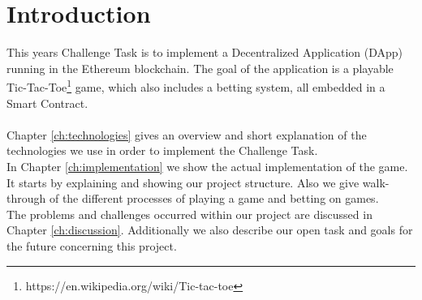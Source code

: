 \chapter{Introduction}\label{ch:introduction}
This years Challenge Task is to implement a Decentralized Application (DApp) running in the Ethereum blockchain. The goal of the application is a playable Tic-Tac-Toe\footnote{https://en.wikipedia.org/wiki/Tic-tac-toe} game, which also includes a betting system, all embedded in a Smart Contract.
\\\\

Chapter \ref{ch:technologies} gives an overview and short explanation of the technologies we use in order to implement the Challenge Task.\\
In Chapter \ref{ch:implementation} we show the actual implementation of the game. It starts by explaining and showing our project structure. Also we give walk-through of the different processes of playing a game and betting on games.\\
The problems and challenges occurred within our project are discussed in Chapter \ref{ch:discussion}. Additionally we also describe our open task and goals for the future concerning this project.